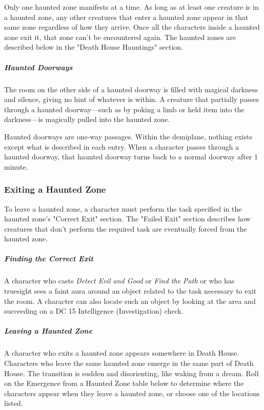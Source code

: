 \documentclass[10pt,a4paper,twoside,bg=print,twocolumn,openany,nodeprecatedcode]{dndbook}
\begin{document}
Only one haunted zone manifests at a time. As long as at least one creature is in a haunted zone, any other creatures that enter a haunted zone appear in that same zone regardless of how they arrive. Once all the characters inside a haunted zone exit it, that zone can't be encountered again. The haunted zones are described below in the "Death House Hauntings" section.

\subparagraph{Haunted Doorways}
The room on the other side of a haunted doorway is filled with magical darkness and silence, giving no hint of whatever is within. A creature that partially passes through a haunted doorway—such as by poking a limb or held item into the darkness—is magically pulled into the haunted zone.

Haunted doorways are one-way passages. Within the demiplane, nothing exists except what is described in each entry. When a character passes through a haunted doorway, that haunted doorway turns back to a normal doorway after 1 minute.

\subsubsection{Exiting a Haunted Zone}
To leave a haunted zone, a character must perform the task specified in the haunted zone's "Correct Exit" section. The "Failed Exit" section describes how creatures that don't perform the required task are eventually forced from the haunted zone.

\subparagraph{Finding the Correct Exit}
A character who casts \textit{Detect Evil and Good} or \textit{Find the Path} or who has truesight sees a faint aura around an object related to the task necessary to exit the room. A character can also locate such an object by looking at the area and succeeding on a DC 15 Intelligence (Investigation) check.

\subparagraph{Leaving a Haunted Zone}
A character who exits a haunted zone appears somewhere in Death House. Characters who leave the same haunted zone emerge in the same part of Death House. The transition is sudden and disorienting, like waking from a dream. Roll on the Emergence from a Haunted Zone table below to determine where the characters appear when they leave a haunted zone, or choose one of the locations listed.
\end{document}
